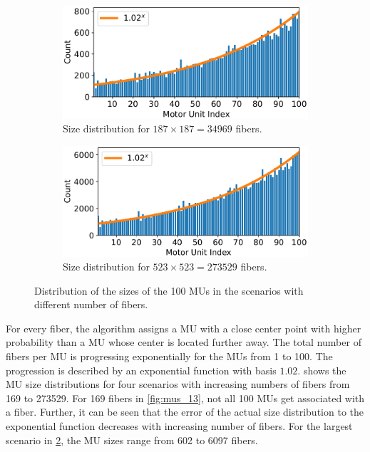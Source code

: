 \begin{figure}
  \begin{subfigure}[t]{0.45\textwidth}%
    \centering%
    \includegraphics[width=\textwidth]{images/results/application/MU_fibre_distribution_187x187_100mus_txt_fiber_distribution.pdf}%
    \caption{Size distribution for $187\times 187 = \num{34969}$ fibers.}%
    \label{fig:mus_187}%
  \end{subfigure} 
  \begin{subfigure}[t]{0.45\textwidth}%
    \centering%
    \includegraphics[width=\textwidth]{images/results/application/MU_fibre_distribution_523x523_100mus_txt_fiber_distribution.pdf}%
    \caption{Size distribution for $523\times 523 = \num{273529}$ fibers.}%
    \label{fig:mus_523}%
  \end{subfigure}   
  \caption{Distribution of the sizes of the 100 MUs in the scenarios with different number of fibers.}%
  \label{fig:mu_sizes_100mus}%
\end{figure}%


For every fiber, the algorithm assigns a MU with a close center point with higher probability than a MU whose center is located further away. The total number of fibers per MU is progressing exponentially for the MUs from 1 to 100. The progression is described by an exponential function with basis $1.02$.  shows the MU size distributions for four scenarios with increasing numbers of fibers from \num{169} to \num{273529}. For 169 fibers in \cref{fig:mus_13}, not all 100 MUs get associated with a fiber. Further, it can be seen that the error of the actual size distribution to the exponential function decreases with increasing number of fibers. For the largest scenario in \cref{fig:mus_523}, the MU sizes range from 602 to 6097 fibers.

